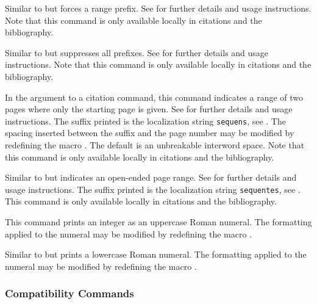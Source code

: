 \documentclass{ltxdockit}[2011/03/25]
\begin{document}
\begin{ltxsyntax}

Similar to  but forces a range prefix. See  for further details and usage instructions. Note that this command is only available locally in citations and the bibliography.


Similar to  but suppresses all prefixes. See  for further details and usage instructions. Note that this command is only available locally in citations and the bibliography.


In the  argument to a citation command, this command indicates a range of two pages where only the starting page is given. See  for further details and usage instructions. The suffix printed is the localization string \texttt{sequens}, see . The spacing inserted between the suffix and the page number may be modified by redefining the macro . The default is an unbreakable interword space. Note that this command is only available locally in citations and the bibliography.


Similar to  but indicates an open-ended page range. See  for further details and usage instructions. The suffix printed is the localization string \texttt{sequentes}, see . This command is only available locally in citations and the bibliography.


This command prints an integer as an uppercase Roman numeral. The formatting applied to the numeral may be modified by redefining the macro .


Similar to  but prints a lowercase Roman numeral. The formatting applied to the numeral may be modified by redefining the macro .

\end{ltxsyntax}

\subsubsection{ Compatibility Commands}
\label{use:cit:nat}
\end{document}
